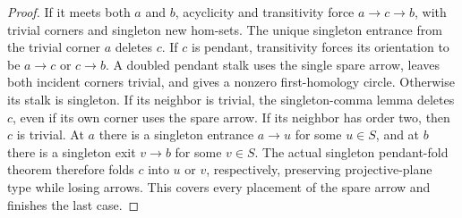 \begin{proof}
If it meets both $a$ and $b$, acyclicity and transitivity force
$a\to c\to b$, with trivial corners and singleton new hom-sets.
The unique singleton entrance from the trivial corner $a$
deletes $c$. If $c$ is pendant, transitivity forces its orientation
to be $a\to c$ or $c\to b$. A doubled pendant stalk uses the
single spare arrow, leaves both incident corners trivial, and
gives a nonzero first-homology circle. Otherwise its stalk is
singleton. If its neighbor is trivial, the singleton-comma
lemma deletes $c$, even if its own corner uses the spare arrow.
If its neighbor has order two, then $c$ is trivial. At $a$
there is a singleton entrance $a\to u$ for some $u\in S$,
and at $b$ there is a singleton exit $v\to b$ for some $v\in S$.
The actual singleton pendant-fold theorem therefore folds $c$
into $u$ or $v$, respectively, preserving projective-plane type while losing
arrows. This covers every placement of the spare arrow and
finishes the last case.
\end{proof}
